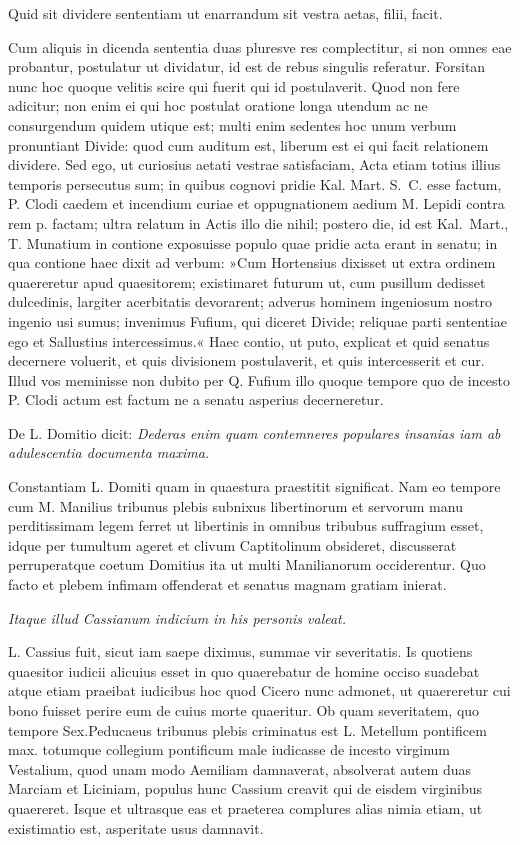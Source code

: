 Quid sit dividere sententiam ut enarrandum sit vestra aetas, filii, facit.

Cum aliquis in dicenda sententia duas pluresve res complectitur, si non omnes eae probantur, postulatur ut dividatur, id est de rebus singulis referatur. Forsitan nunc hoc quoque velitis scire qui fuerit qui id postulaverit. Quod non fere adicitur; non enim ei qui hoc postulat oratione longa utendum ac ne consurgendum quidem utique est; multi enim sedentes hoc unum verbum pronuntiant Divide: quod cum auditum est, liberum est ei qui facit relationem dividere. Sed ego, ut curiosius aetati vestrae satisfaciam, Acta etiam totius illius temporis persecutus sum; in quibus cognovi pridie Kal. Mart. S.~C. esse factum, P. Clodi caedem et incendium curiae et oppugnationem aedium M. Lepidi contra rem p. factam; ultra relatum in Actis illo die nihil; postero die, id est Kal.~Mart., T. Munatium in contione exposuisse populo quae pridie acta erant in senatu; in qua contione haec dixit ad verbum: »Cum Hortensius dixisset ut extra ordinem quaereretur apud quaesitorem; existimaret futurum ut, cum pusillum dedisset dulcedinis, largiter acerbitatis devorarent; adverus hominem ingeniosum nostro ingenio usi sumus; invenimus Fufium, qui diceret Divide; reliquae parti sententiae ego et Sallustius intercessimus.« Haec contio, ut puto, explicat et quid senatus decernere voluerit, et quis divisionem postulaverit, et quis intercesserit et cur. Illud vos meminisse non dubito per Q. Fufium illo quoque tempore quo de incesto P. Clodi actum est factum ne a senatu asperius decerneretur.

De L. Domitio dicit: \textit{Dederas enim quam contemneres populares insanias iam ab adulescentia documenta maxima.}

Constantiam L. Domiti quam in quaestura praestitit significat. Nam eo tempore cum M. Manilius tribunus plebis subnixus libertinorum et servorum manu perditissimam legem ferret ut libertinis in omnibus tribubus suffragium esset, idque per tumultum ageret et clivum Captitolinum obsideret, discusserat perruperatque coetum Domitius ita ut multi Manilianorum occiderentur. Quo facto et plebem infimam offenderat et senatus magnam gratiam inierat.

\textit{Itaque illud Cassianum indicium in his personis valeat.}

L. Cassius fuit, sicut iam saepe diximus, summae vir severitatis. Is quotiens quaesitor iudicii alicuius esset in quo quaerebatur de homine occiso suadebat atque etiam praeibat iudicibus hoc quod Cicero nunc admonet, ut quaereretur cui bono fuisset perire eum de cuius morte quaeritur. Ob quam severitatem, quo tempore Sex.Peducaeus tribunus plebis criminatus est L. Metellum pontificem max. totumque collegium pontificum male iudicasse de incesto virginum Vestalium, quod unam modo Aemiliam damnaverat, absolverat autem duas Marciam et Liciniam, populus hunc Cassium creavit qui de eisdem virginibus quaereret. Isque et ultrasque eas et praeterea complures alias nimia etiam, ut existimatio est, asperitate usus damnavit.

